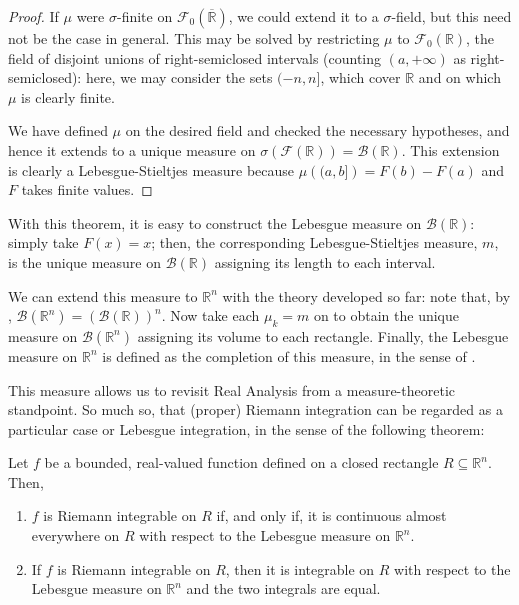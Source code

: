 \begin{proof}
If \(\mu\) were \(\sigma\)-finite on \(\mathcal{F}_0(\overline{\mathbb{R}})\), we could extend it to a \(\sigma\)-field, but this need not be the case in general. This may be solved by restricting \(\mu\) to \(\mathcal{F}_0(\mathbb{R})\), the field of disjoint unions of right-semiclosed intervals (counting \((a,+\infty)\) as right-semiclosed): here, we may consider the sets \((-n,n]\), which cover \(\mathbb{R}\) and on which \(\mu\) is clearly finite.

We have defined \(\mu\) on the desired field and checked the necessary hypotheses, and hence it extends to a unique measure on \(\sigma(\mathcal{F}(\mathbb{R}))=\mathscr{B}\left(\mathbb{R}\right)\). This extension is clearly a Lebesgue-Stieltjes measure because \(\mu\left( (a,b]\right)=F(b)-F(a)\) and \(F\) takes finite values.
\end{proof}


With this theorem, it is easy to construct the Lebesgue measure on \(\mathscr{B}\left(\mathbb{R}\right)\): simply take \(F(x)=x\); then, the corresponding Lebesgue-Stieltjes measure, \(m\), is the unique measure on \(\mathscr{B}\left(\mathbb{R}\right)\) assigning its length to each interval.

We can extend this measure to \(\mathbb{R}^{n}\) with the theory developed so far: note that, by , \(\mathscr{B}\left(\mathbb{R}^{n}\right)=\left(\mathscr{B}\left(\mathbb{R}\right)\right)^n\). Now take each \(\mu_k=m\) on  to obtain the unique measure on \(\mathscr{B}\left(\mathbb{R}^{n}\right)\) assigning its volume to each rectangle. Finally, the Lebesgue measure on \(\mathbb{R}^{n}\) is defined as the completion of this measure, in the sense of .

This measure allows us to revisit Real Analysis from a measure-theoretic standpoint. So much so, that (proper) Riemann integration can be regarded as a particular case or Lebesgue integration, in the sense of the following theorem:

\begin{thrm}\label{theorem:Riemann and Lebesgue} Let \(f\) be a bounded, real-valued function defined on a closed rectangle \(R\subseteq\mathbb{R}^n\). Then,
	\begin{enumerate}
		\item \(f\) is Riemann integrable on \(R\) if, and only if, it is
continuous almost everywhere on \(R\) with respect to the Lebesgue measure on \(\mathbb{R}^{n}\).
		\item If \(f\) is Riemann integrable on \(R\), then it is integrable on \(R\)
with respect to the Lebesgue measure on \(\mathbb{R}^{n}\) and the two integrals are
equal.
	\end{enumerate}
\end{thrm}

